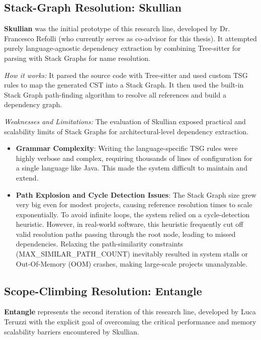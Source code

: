 \subsection{Stack-Graph Resolution: Skullian}
\label{sec:skullian}

\textbf{Skullian} \cite{refolli_2023} was the initial prototype of
this research line, developed by Dr. Francesco Refolli (who currently
serves as co-advisor for this thesis). It attempted purely
language-agnostic dependency extraction by combining Tree-sitter for
parsing with Stack Graphs for name resolution.

\textit{How it works:} It parsed the source code with Tree-sitter and
used custom TSG rules to map the generated CST into a Stack Graph. It
then used the built-in Stack Graph path-finding algorithm to resolve
all references and build a dependency graph.

\textit{Weaknesses and Limitations:} The evaluation of Skullian
exposed practical and scalability limits of Stack Graphs for
architectural-level dependency extraction.
\begin{itemize}
  \item \textbf{Grammar Complexity}: Writing the language-specific
    TSG rules were highly verbose and complex, requiring thousands of
    lines of configuration for a single language like Java. This made
    the system difficult to maintain and extend.
  \item \textbf{Path Explosion and Cycle Detection Issues}: The Stack
    Graph size grew very big even for modest projects, causing
    reference resolution times to scale exponentially. To avoid
    infinite loops, the system relied on a cycle-detection heuristic.
    However, in real-world software, this heuristic frequently cut
    off valid resolution paths passing through the root node, leading
    to missed dependencies. Relaxing the path-similarity constraints
    (MAX\_SIMILAR\_PATH\_COUNT) inevitably resulted in system stalls or
    Out-Of-Memory (OOM) crashes, making large-scale projects unanalyzable.
\end{itemize}

\subsection{Scope-Climbing Resolution: Entangle}
\label{sec:entangle}

\textbf{Entangle} \cite{teruzzi_2024} represents the second iteration
of this research line, developed by Luca Teruzzi with the explicit
goal of overcoming the critical performance and memory scalability
barriers encountered by Skullian.

